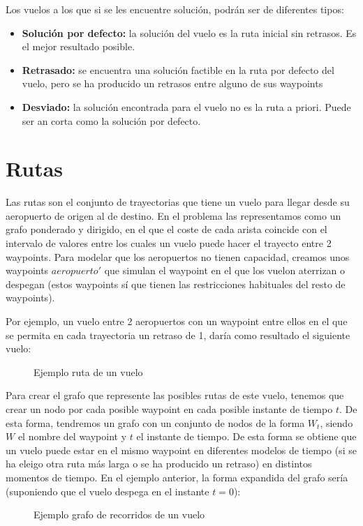 Los vuelos a los que si se les encuentre solución, podrán ser  de diferentes tipos:
\begin{itemize}
	\item \textbf{Solución por defecto:} la solución del vuelo es la ruta inicial sin retrasos. Es el mejor resultado posible.
	\item \textbf{Retrasado:} se encuentra una solución factible en la ruta por defecto del vuelo, pero se ha producido un retrasos entre alguno de sus waypoints
	\item \textbf{Desviado:} la solución encontrada para el vuelo no es la ruta a priori. Puede ser an corta como la solución por defecto.
\end{itemize}


\section{Rutas}
Las rutas son el conjunto de trayectorias que tiene un vuelo para llegar desde su aeropuerto de origen al de destino. En el problema las representamos como un grafo ponderado y dirigido, en el que el coste de cada arista coincide con el intervalo de valores entre los cuales un vuelo puede hacer el trayecto entre 2 waypoints. Para modelar que los aeropuertos no tienen capacidad, creamos unos waypoints $aeropuerto'$ que simulan el waypoint en el que los vuelon aterrizan o despegan (estos waypoints sí que tienen las restricciones habituales del resto de waypoints).

Por ejemplo, un vuelo entre 2 aeropuertos con un waypoint entre ellos en el que se permita en cada trayectoria un retraso de 1, daría como resultado el siguiente vuelo:
\begin{figure}[H]
	\centering
	
	\caption{Ejemplo ruta de un vuelo}
	\label{fig: Ejemplo ruta de un vuelo}
\end{figure}

Para crear el grafo que represente las posibles rutas de este vuelo, tenemos que crear un nodo por cada posible waypoint en cada posible instante de tiempo $t$. De esta forma, tendremos un grafo con un conjunto de nodos de la forma $W_{t}$, siendo $W$ el nombre del waypoint y $t$ el instante de tiempo. De esta forma se obtiene que un vuelo puede estar en el mismo waypoint en diferentes modelos de tiempo (si se ha eleigo otra ruta más larga o se ha producido un retraso) en distintos momentos de tiempo. En el ejemplo anterior, la forma expandida del grafo sería (suponiendo que el vuelo despega en el instante $t=0$): 
\begin{figure}[H]
	\centering
	
	\caption{Ejemplo grafo de recorridos de un vuelo}
	\label{fig: Ejemplo grafo de recorridos de un vuelo}
\end{figure}

